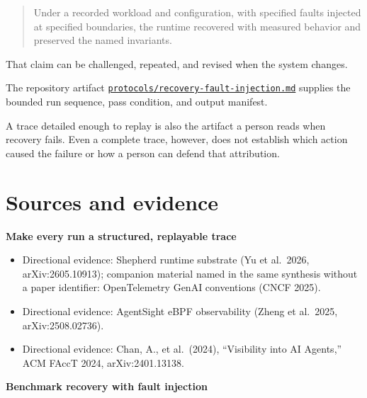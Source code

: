 \begin{quote}
Under a recorded workload and configuration, with specified faults injected at specified boundaries, the runtime recovered with measured behavior and preserved the named invariants.
\end{quote}

That claim can be challenged, repeated, and revised when the system changes.

The repository artifact \href{https://github.com/sjarmak/engineering-reliable-coding-agents/blob/main/protocols/recovery-fault-injection.md}{\texttt{protocols/recovery-fault-injection.md}} supplies the bounded run sequence, pass condition, and output manifest.

A trace detailed enough to replay is also the artifact a person reads when recovery fails. Even a complete trace, however, does not establish which action caused the failure or how a person can defend that attribution.

\section*{Sources and evidence}

\textbf{Make every run a structured, replayable trace}

\begin{itemize}
\tightlist
\item
  Directional evidence: Shepherd runtime substrate (Yu et al.~2026, arXiv:2605.10913); companion material named in the same synthesis without a paper identifier: OpenTelemetry GenAI conventions (CNCF 2025).
\item
  Directional evidence: AgentSight eBPF observability (Zheng et al.~2025, arXiv:2508.02736).
\item
  Directional evidence: Chan, A., et al.~(2024), ``Visibility into AI Agents,'' ACM FAccT 2024, arXiv:2401.13138.
\end{itemize}

\textbf{Benchmark recovery with fault injection}


